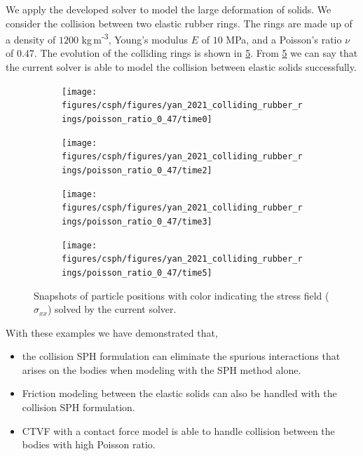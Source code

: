 We apply the developed solver to model the large deformation of
solids. We consider the collision between two elastic rubber rings. The rings
are made up of a density of $1200$ kg\,m\textsuperscript{-3}, Young's modulus
$E$ of $10$ MPa, and a Poisson's ratio $\nu$ of $0.47$. The evolution of the
colliding rings is shown in \cref{fig:rings:new-ipst-nu-0-47}. From
\cref{fig:rings:new-ipst-nu-0-47} we can say that the current solver is able to
model the collision between elastic solids successfully.
\begin{figure}[tpb]
  \centering
  \begin{subfigure}{0.48\textwidth}
    \centering
    \texttt{[image: figures/csph/figures/yan\_2021\_colliding\_rubber\_rings/poisson\_ratio\_0\_47/time0]}
    \label{fig:rings:ipst-nu-0.47-1}
  \end{subfigure}
  \begin{subfigure}{0.48\textwidth}
    \centering
    \texttt{[image: figures/csph/figures/yan\_2021\_colliding\_rubber\_rings/poisson\_ratio\_0\_47/time2]}
    \label{fig:rings:ipst-nu-0.47-3}
  \end{subfigure}

  \begin{subfigure}{0.48\textwidth}
    \centering
    \texttt{[image: figures/csph/figures/yan\_2021\_colliding\_rubber\_rings/poisson\_ratio\_0\_47/time3]}
    \label{fig:rings:ipst-nu-0.47-4}
  \end{subfigure}
%
  \begin{subfigure}{0.48\textwidth}
    \centering
    \texttt{[image: figures/csph/figures/yan\_2021\_colliding\_rubber\_rings/poisson\_ratio\_0\_47/time5]}
    \label{fig:rings:ipst-nu-0.47-4}
  \end{subfigure}
  \caption{Snapshots of particle positions with color indicating the stress
    field ($\sigma_{xx}$) solved by the current solver.}
\label{fig:rings:new-ipst-nu-0-47}
\end{figure}
%

With these examples we have demonstrated that,
\begin{itemize}
\item the collision SPH formulation can eliminate the spurious interactions that
  arises on the bodies when modeling with the SPH method alone.
\item Friction modeling between the elastic solids can also be handled with
  the collision SPH formulation.
\item CTVF with a contact force model is able to handle collision between the
  bodies with high Poisson ratio.
\end{itemize}
